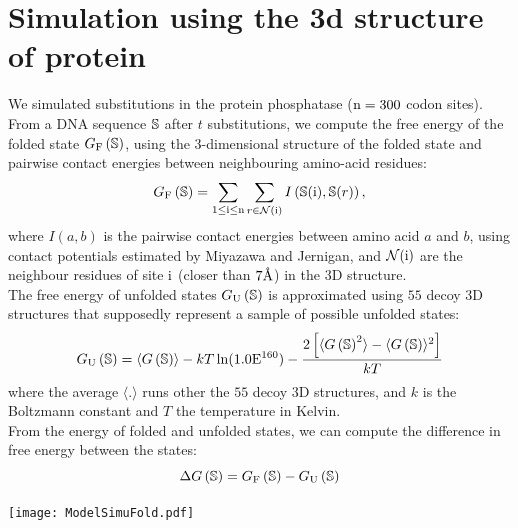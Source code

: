 \section{Simulation using the 3d structure of protein}
We simulated substitutions in the protein phosphatase ($\text{n}=300$ codon sites).
From a \acrshort{DNA} sequence $\mathbb{S}$ after $t$ substitutions, we compute the free energy of the folded state $G_{\mathrm{F}}\left(\mathbb{S}\right)$, using the $3$-dimensional structure of the folded state and pairwise contact energies between neighbouring amino-acid residues:
\begin{equation}
G_{\mathrm{F}}\left(\mathbb{S}\right) = \sum\limits_{1 \leq \text{i} \leq \text{n}} \sum\limits_{r \in \mathcal{N}(\text{i})} I \left(\mathbb{S}(\text{i}), \mathbb{S}(r) \right),
\end{equation}
where $I(a,b)$ is the pairwise contact energies between amino acid $a$ and $b$, using contact potentials estimated by Miyazawa and Jernigan, and $\mathcal{N}(\text{i})$ are the neighbour residues of site $\text{i}$ (closer than $7\text{\normalfont\AA}$) in the $3$D structure.\\
The free energy of unfolded states $G_{\mathrm{U}}\left(\mathbb{S}\right)$ is approximated using $55$ decoy $3$D structures that supposedly represent a sample of possible unfolded states:
\begin{equation}
G_{\mathrm{U}}\left(\mathbb{S}\right) = \langle G\left(\mathbb{S}\right) \rangle - kT \ln (1.0\mathrm{E}^{160}) - \frac{2 \left[ \langle G\left(\mathbb{S}\right)^2 \rangle - \langle G\left(\mathbb{S}\right) \rangle^2\right] }{kT}
\end{equation}
where the average $\langle . \rangle$ runs other the $55$ decoy $3$D structures, and $k$ is the Boltzmann constant and $T$ the temperature in Kelvin.\\
From the energy of folded and unfolded states, we can compute the difference in free energy between the states:
\begin{equation}
\Delta G\left(\mathbb{S}\right) = G_{\mathrm{F}}\left(\mathbb{S}\right) - G_{\mathrm{U}}\left(\mathbb{S}\right)
\end{equation}
\begin{center}
 \texttt{[image: ModelSimuFold.pdf]}
\end{center}

